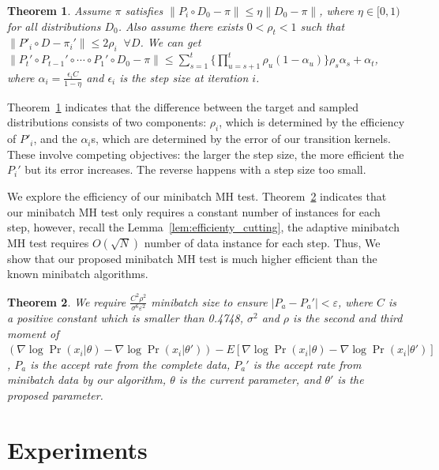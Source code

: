 \documentclass{article}
\newtheorem{theorem}{Theorem}
\begin{document}
\begin{theorem}\label{thm:theory3}
Assume $\pi$ satisfies $\|P_i \circ D_0 - \pi\| \leq \eta \|D_0 - \pi\|$, where $\eta \in [0, 1)$ for
all distributions $D_0$. Also assume there exists $0 < \rho_t < 1$ such that $\|P'_i \circ D -
\pi_i'\| \leq 2\rho_i \;\; \forall D$. We can get $\| P_t' \circ P_{t-1}' \circ \cdots \circ P_1' \circ D_0 - \pi
\| \leq \sum_{s=1}^t \{\prod _{u=s+1}^t \rho_u (1-\alpha_u)\} \rho_s \alpha_s + \alpha_t $, where
$\alpha_i = \frac{\epsilon_i C }{1-\eta}$ and $\epsilon_i$ is the step size at iteration $i$.
\end{theorem}


Theorem~\ref{thm:theory3} indicates that the difference between the target and sampled distributions
consists of two components: $\rho_i$, which is determined by the efficiency of $P'_i$, and the
$\alpha_i$s, which are determined by the error of our transition kernels. These involve competing
objectives: the larger the step size, the more efficient the $P_i'$ but its error increases.  The
reverse happens with a step size too small.

We explore the efficiency of our minibatch MH test. Theorem~\ref{thm:efficiency} indicates that our minibatch MH test only requires a constant number of instances for each step, however, recall the Lemma~\ref{lem:efficienty_cutting}, the adaptive minibatch MH test requires $O(\sqrt{N})$ number of data instance for each step. Thus, We show that our proposed minibatch MH test is much higher efficient than the known minibatch algorithms. 

\begin{theorem}\label{thm:efficiency}
We require $\frac{ C^2 \rho^2 }{\sigma^6 \varepsilon^2}$ minibatch size to ensure $|P_a -P_a'| < \varepsilon$, where $C$ is a positive constant which is smaller than 0.4748, $\sigma^2 $ and $\rho$ is the second and third moment of $(\nabla\log \Pr(x_i|\theta) - \nabla\log\Pr(x_i|\theta')) - E\left[ \nabla\log \Pr(x_i|\theta) - \nabla\log\Pr(x_i|\theta')\right]$, $P_a$ is the accept rate from the complete data, $P_a'$ is the accept rate from minibatch data by our algorithm, $\theta$ is the current parameter, and $\theta'$ is the proposed parameter. 

\end{theorem}


\section{Experiments}\label{sec:experiments}
\end{document}
